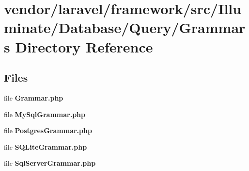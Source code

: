 \section{vendor/laravel/framework/src/\+Illuminate/\+Database/\+Query/\+Grammars Directory Reference}
\label{dir_0482b6cf9af794a94ffaf8b20d5111f0}
\subsection*{Files}
\begin{DoxyCompactItemize}
\item 
file {\bf Grammar.\+php}
\item 
file {\bf My\+Sql\+Grammar.\+php}
\item 
file {\bf Postgres\+Grammar.\+php}
\item 
file {\bf S\+Q\+Lite\+Grammar.\+php}
\item 
file {\bf Sql\+Server\+Grammar.\+php}
\end{DoxyCompactItemize}
